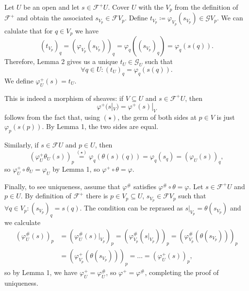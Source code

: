 Let $U$ be an open and let $s \in \mathcal{F}^+U$.
Cover $U$ with the $V_p$ from the definition of $\mathcal{F}^+$
and obtain the associated $s_{V_p} \in \mathcal{F}V_p$. Define
$t_{V_p} \coloneqq \varphi_{V_p}(s_{V_p}) \in \mathcal{G}V_p$. We can calulate that
for $q \in V_p$ we have
\[ (t_{V_p})_q = (\varphi_{V_p}(s_{V_p}))_q = \varphi_q((s_{V_p})_q) = \varphi_q(s(q)). \]
Therefore, Lemma 2 gives us a unique $t_U \in \mathcal{G}_U$ such that
\begin{equation}\tag{$\star$}
	\forall q \in U\colon (t_U)_q = \varphi_q(s(q)).
\end{equation}
We define $\varphi^+_U(s) = t_U$.

This is indeed a morphism of sheaves: if $V \subseteq U$ and $s \in \mathcal{F}^+U$,
then
\[ \varphi^+(s|_V) = \varphi^+(s)|_V \]
follows from the fact that, using $(\star)$, the germ of both sides at $p \in V$
is just $\varphi_p(s(p))$. By Lemma 1, the two sides are equal.

Similarly, if $s \in \mathcal{F}U$ and $p \in U$, then
\[ (\varphi^+_U\theta_U(s))_p \stackrel{(\star)}{=} \varphi_q(\theta(s)(q)) = \varphi_q(s_q) = (\varphi_U(s))_q, \]
so $\varphi^+_U \circ \theta_U = \varphi_U$ by Lemma 1, so
$\varphi^+ \circ \theta = \varphi$.

Finally, to see uniqueness, assume that $\varphi^\#$ satisfies
 $\varphi^\# \circ \theta = \varphi$. Let $s \in \mathcal{F}^+U$ and $p \in U$.
By definition of $\mathcal{F}^+$ there is $p \in V_p \subseteq U$, $s_{V_p} \in \mathcal{F}V_p$
such that $\forall q \in V_p\colon (s_{V_p})_q = s(q)$. The condition can be
reprased as $s|_{V_p} = \theta(s_{V_p})$ and we calculate
\begin{align*}
	(\varphi^\#_U(s))_p &= (\varphi_U^\#(s)|_{V_p})_p
= (\varphi_{V_p}^\#(s|_{V_p}))_p
= (\varphi_{V_p}^\#(\theta(s_{V_p})))_p\\
	&= (\varphi_{V_p}^+(\theta(s_{V_p})))_p = \ldots = (\varphi^+_U(s))_p,
\end{align*}
so by Lemma 1, we have $\varphi^+_U = \varphi^\#_U$, so $\varphi^+ = \varphi^\#$,
completing the proof of uniqueness.

